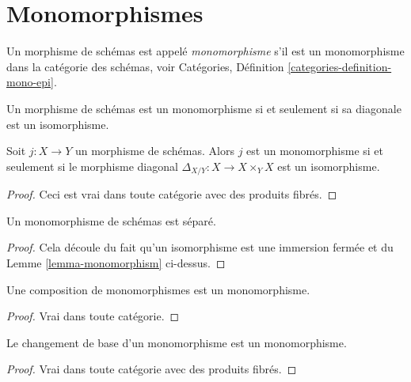 \section{Monomorphismes}
\label{section-monomorphisms}

\begin{definition}
\label{definition-monomorphism}
Un morphisme de schémas est appelé  {\it  monomorphisme
}  s'il est un monomorphisme dans la catégorie des schémas, voir
Catégories, Définition  \ref{categories-definition-mono-epi}.
\end{definition}

\begin{lemma}
\label{lemma-monomorphism}
\begin{slogan}
Un morphisme de schémas est un monomorphisme si et seulement si sa diagonale est un
isomorphisme.
\end{slogan}
Soit  $j : X \to Y$  un morphisme de schémas. Alors  $j$  est un monomorphisme
si et seulement si le morphisme diagonal  $\Delta_{X/Y} : X \to X \times_Y X$  est un isomorphisme.
\end{lemma}

\begin{proof}
Ceci est vrai dans toute catégorie avec des produits fibrés.
\end{proof}

\begin{lemma}
\label{lemma-monomorphism-separated}
Un monomorphisme de schémas est séparé.
\end{lemma}

\begin{proof}
Cela découle du fait qu'un isomorphisme est une immersion fermée et du Lemme
 \ref{lemma-monomorphism}  ci-dessus.
\end{proof}

\begin{lemma}
\label{lemma-composition-monomorphism}
Une composition de monomorphismes est un monomorphisme.
\end{lemma}

\begin{proof}
Vrai dans toute catégorie.
\end{proof}

\begin{lemma}
\label{lemma-base-change-monomorphism}
Le changement de base d'un monomorphisme est un monomorphisme.
\end{lemma}

\begin{proof}
Vrai dans toute catégorie avec des produits fibrés.
\end{proof}

